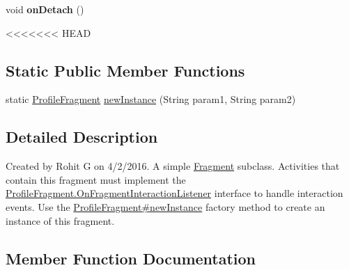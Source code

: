 \begin{DoxyCompactItemize}
\begin{DoxyCompactItemize}
\item 
\hypertarget{classcom_1_1example_1_1sel_1_1lostfound_1_1ProfileFragment_a922ba5757676d5642082baaed332dfb1}{void {\bfseries on\-Detach} ()}\label{classcom_1_1example_1_1sel_1_1lostfound_1_1ProfileFragment_a922ba5757676d5642082baaed332dfb1}

\end{DoxyCompactItemize}
<<<<<<< HEAD
\subsection*{Static Public Member Functions}
\begin{DoxyCompactItemize}
\item 
static \hyperlink{classcom_1_1example_1_1sel_1_1lostfound_1_1ProfileFragment}{Profile\-Fragment} \hyperlink{classcom_1_1example_1_1sel_1_1lostfound_1_1ProfileFragment_a2a0246ef59fbd7dd833eb7db772302c6}{new\-Instance} (String param1, String param2)
\end{DoxyCompactItemize}


\subsection{Detailed Description}
Created by Rohit G on 4/2/2016. A simple \hyperlink{}{Fragment} subclass. Activities that contain this fragment must implement the \hyperlink{interfacecom_1_1example_1_1sel_1_1lostfound_1_1ProfileFragment_1_1OnFragmentInteractionListener}{Profile\-Fragment.\-On\-Fragment\-Interaction\-Listener} interface to handle interaction events. Use the \hyperlink{classcom_1_1example_1_1sel_1_1lostfound_1_1ProfileFragment_a2a0246ef59fbd7dd833eb7db772302c6}{Profile\-Fragment\#new\-Instance} factory method to create an instance of this fragment. 

\subsection{Member Function Documentation}
\hypertarget{classcom_1_1example_1_1sel_1_1lostfound_1_1ProfileFragment_a2a0246ef59fbd7dd833eb7db772302c6}{
}
\end{DoxyCompactItemize}
